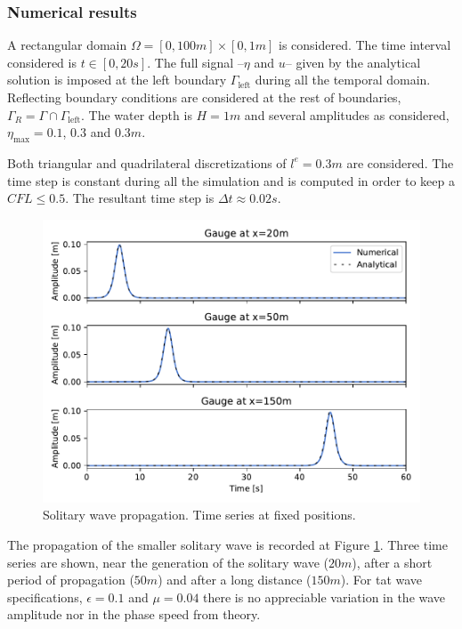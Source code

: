 \subsubsection{Numerical results}


A rectangular domain $\Omega = [0,100m] \times [0,1m]$ is considered. The time interval considered is $t\in[0,20s]$. The full signal --$\eta$ and $u$-- given by the analytical solution is imposed at the left boundary $\Gamma_\text{left}$ during all the temporal domain. Reflecting boundary conditions are considered at the rest of boundaries, $\Gamma_R = \Gamma \cap \Gamma_\text{left}$. The water depth is $H=1m$ and several amplitudes as considered, $\eta_\text{max}=0.1$, $0.3$ and $0.3m$.

Both triangular and quadrilateral discretizations of $l^e=0.3m$ are considered. The time step is constant during all the simulation and is computed in order to keep a $CFL\leq0.5$. The resultant time step is $\Delta t\approx0.02s$.

\begin{figure} [tb!]
    \centering
    \includegraphics[width=.8\textwidth]{img/boussinesq/gauges.pdf}
    \caption{Solitary wave propagation. Time series at fixed positions.}
    \label{bsq_solitary_wave_gauges}
\end{figure}

The propagation of the smaller solitary wave is recorded at Figure \ref{bsq_solitary_wave_gauges}. Three time series are shown, near the generation of the solitary wave ($20m$), after a short period of propagation ($50m$) and after a long distance ($150m$). For tat wave specifications, $\epsilon=0.1$ and $\mu=0.04$ there is no appreciable variation in the wave amplitude nor in the phase speed from theory.

